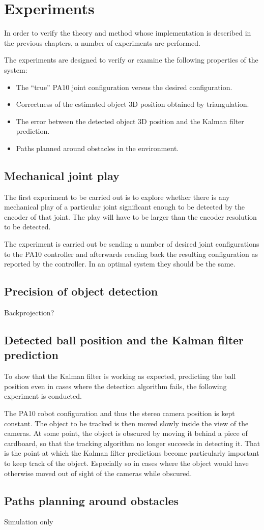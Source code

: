 \chapter{Experiments}
\label{cha:experiments}
In order to verify the theory and method whose implementation is described in the previous chapters, a number of experiments are performed.

The experiments are designed to verify or examine the following properties of the system:
\begin{itemize}
    \item The ``true'' PA10 joint configuration versus the desired configuration.
    \item Correctness of the estimated object 3D position obtained by triangulation. %
    \item The error between the detected object 3D position and the Kalman filter prediction.
    \item Paths planned around obstacles in the environment.
\end{itemize}

\section{Mechanical joint play}
The first experiment to be carried out is to explore whether there is any mechanical play of a particular joint significant enough to be detected by the encoder of that joint.
The play will have to be larger than the encoder resolution to be detected.

The experiment is carried out be sending a number of desired joint configurations to the PA10 controller and afterwards reading back the resulting configuration as reported by the controller.
In an optimal system they should be the same.

\section{Precision of object detection}
Backprojection?

\section{Detected ball position and the Kalman filter prediction}
To show that the Kalman filter is working as expected,
predicting the ball position even in cases where the detection algorithm fails, the following experiment is conducted.

The PA10 robot configuration and thus the stereo camera position is kept constant.
The object to be tracked is then moved slowly inside the view of the cameras. At some point, the object is obscured by moving it behind a piece of cardboard, so that the tracking algorithm no longer succeeds in detecting it.
That is the point at which the Kalman filter predictions become particularly important to keep track of the object. Especially so in cases where the object would have otherwise moved out of sight of the cameras while obscured.


\section{Paths planning around obstacles}
Simulation only
